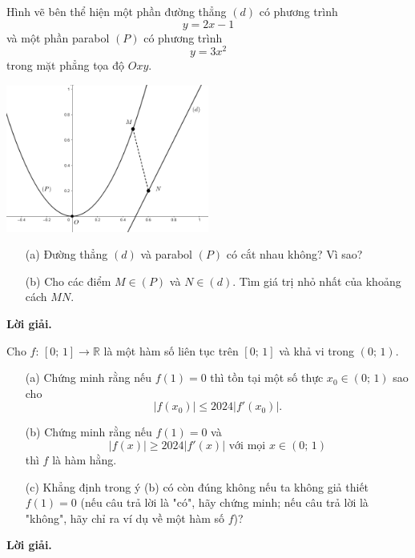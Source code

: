 \begin{tcolorbox}[title=\textbf{Bài toán B.3 + A.3.},breakable]
    Hình vẽ bên thể hiện một phần đường thẳng $(d)$ có phương trình $$y = 2x - 1$$ và một phần parabol $(P)$ có phương trình $$y = 3x^2$$ trong mặt phẳng tọa độ $Oxy$.
    \begin{center}
        \includegraphics[width=0.5\textwidth]{Figures/04.png}
    \end{center}
    \begin{enumerate}
        \item[(a)] {Đường thẳng $(d)$ và parabol $(P)$ có cắt nhau không? Vì sao?}
        \item[(b)] {Cho các điểm $M \in (P)$ và $N\in (d)$. Tìm giá trị nhỏ nhất của khoảng cách $MN$.} 
    \end{enumerate}
\end{tcolorbox}

\textbf{Lời giải. }



\begin{tcolorbox}[title=\textbf{Bài toán B.4.},breakable]
    Cho $f:\,[0;\,1] \to \mathbb{R}$ là một hàm số liên tục trên $[0;\,1]$ và khả vi trong $(0;\,1)$.

    \begin{enumerate}
        \item[(a)] {Chứng minh rằng nếu $f(1) = 0$ thì tồn tại một số thực $x_0 \in (0;\,1)$ sao cho $$|f(x_0)| \leq 2024|f'(x_0)|.$$}
        \item[(b)] {Chứng minh rằng nếu $f(1) = 0$ và $$|f(x)| \geq 2024|f'(x)|\text{ với mọi }x \in (0;\,1)$$ thì $f$ là hàm hằng.}
        \item[(c)] {Khẳng định trong ý (b) có còn đúng không nếu ta không giả thiết $f(1) = 0$ (nếu câu trả lời là "có", hãy chứng minh; nếu câu trả lời là "không", hãy chỉ ra ví dụ về một hàm số $f$)?}  
    \end{enumerate}
\end{tcolorbox}

\textbf{Lời giải. }

